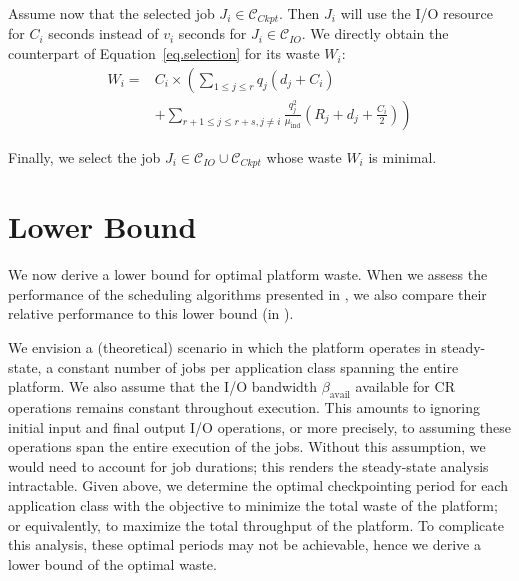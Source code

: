 \documentclass[two]{article}
\newcommand{\muind}{\mu_{\text{ind}}}
\newcommand{\bandavail}{\beta_{\text{avail}}}
\newcommand{\ckpt}[1]{C_{#1}}
\newcommand{\reco}[1]{R_{#1}}
\newcommand{\wap}[1]{W_{#1}}
\newcommand{\Catiocat}{\mathcal{C}_{IO}\xspace}
\newcommand{\Catckptcat}{\mathcal{C}_{Ckpt}\xspace}
\begin{document}
Assume now that the selected job $J_{i} \in \Catckptcat$. Then $J_{i}$
will use the I/O resource for $\ckpt{i}$ seconds instead of $v_{i}$
seconds for $J_{i} \in \Catiocat$. We directly obtain the counterpart
of Equation~\eqref{eq.selection} for its waste $\wap{i}$:
 \begin{equation}
\label{eq.selection2}
 \begin{array}{ll}
 \wap{i} = & \ckpt{i} \times \left( \sum_{1 \leq j \leq r} q_{j} (d_{j} + \ckpt{i}) \right.\\
& + \left. \sum_{r+1 \leq j \leq r+s, j\neq i}   \frac{q^{2}_{j}}{\muind} (\reco{j} + d_{j} + \frac{C_{i}}{2}) \right)
 \end{array}
\end{equation}

Finally, we select the job $J_{i} \in \Catiocat \cup \Catckptcat$
whose waste $\wap{i}$ is minimal. 



%

\section{Lower Bound}
\label{sec:lowerbound}

We now derive a lower bound for optimal platform waste.  When we assess the
performance of the scheduling algorithms presented in , we
also compare their relative performance to this lower bound (in
).

We envision a (theoretical) scenario in which the platform operates in
steady-state, a constant number of jobs per application class spanning the
entire platform.  We also assume that the I/O bandwidth $\bandavail$ available
for CR operations remains constant throughout execution. This amounts to
ignoring initial input and final output I/O operations, or more precisely, to
assuming these operations span the entire execution of the jobs.  Without this
assumption, we would need to account for job durations; this renders the
steady-state analysis intractable.  Given above, we determine the optimal
checkpointing period for each application class with the objective to minimize
the total waste of the platform; or equivalently, to maximize the total
throughput of the platform. To complicate this analysis, these optimal periods
may not be achievable, hence we derive a lower bound of the optimal waste.
\end{document}
